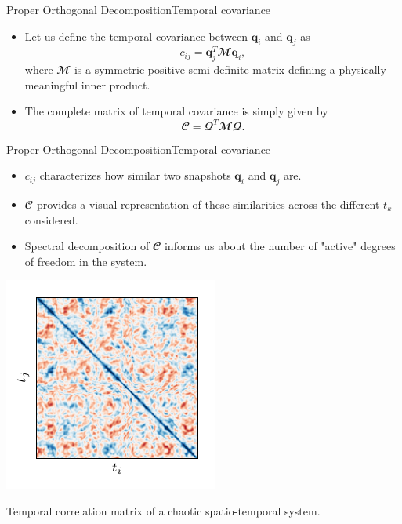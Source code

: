 \documentclass[usenames,dvipsnames,svgnames,10pt,aspectratio=169]{beamer}
\begin{document}
\begin{frame}[t, c]{Proper Orthogonal Decomposition}{Temporal covariance}
	\begin{itemize}
		\item Let us define the temporal covariance between $\mathbf{q}_i$ and $\mathbf{q}_j$ as
		$$c_{ij} = \mathbf{q}_j^T \mathbfcal{M} \mathbf{q}_i,$$
		where $\mathbfcal{M}$ is a symmetric positive semi-definite matrix defining a physically meaningful inner product.

		\bigskip

		\item The complete matrix of temporal covariance is simply given by
		$$\mathbfcal{C} = \mathbfcal{Q}^T \mathbfcal{M} \mathbfcal{Q}.$$
	\end{itemize}

	\vspace{1cm}
\end{frame}

\begin{frame}[t, c]{Proper Orthogonal Decomposition}{Temporal covariance}
	\begin{minipage}{.48\textwidth}
		\begin{itemize}
			\item $c_{ij}$ characterizes how similar two snapshots $\mathbf{q}_i$ and $\mathbf{q}_j$ are.

			\bigskip

			\item $\mathbfcal{C}$ provides a visual representation of these similarities across the different $t_k$ considered.

			\bigskip

			\item Spectral decomposition of $\mathbfcal{C}$ informs us about the number of "active" degrees of freedom in the system.
		\end{itemize}
	\end{minipage}%
	\hfill
	\begin{minipage}{.48\textwidth}
		\centering
		\includegraphics[width=.66\textwidth]{kuramoto_sivashinky_temporal_correlation}

		{\small Temporal correlation matrix of a chaotic spatio-temporal system.}
	\end{minipage}

	\vspace{1cm}
\end{frame}
\end{document}
